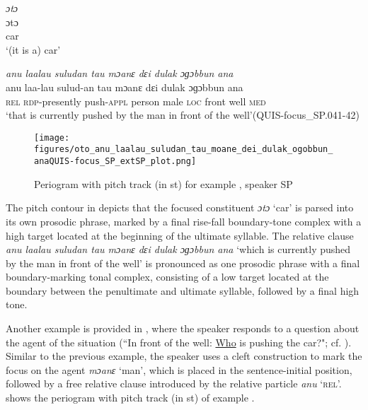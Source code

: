 \ea
\label{ex:Oto ana focus}
\ea
	\label{ex:oto1}
	\textit{ɔtɔ} \\
	\gll ɔtɔ\\
	car\\
	\glt `(it is a) car'

	\ex
	\label{ex:anu laalau suludan tau moane dɛi dulak ɔɡɔbbun ana1}
	\textit{anu la​a​lau suludan tau mɔanɛ dɛi dulak ɔɡɔbbun ana} \\
	\gll anu laa-lau sulud-an tau mɔanɛ dɛi dulak ɔɡɔbbun ana\\
	\textsc{rel} \textsc{rdp}-presently push-\textsc{appl} person male \textsc{loc} front well \textsc{med}\\
	\glt `that is currently pushed by the man in front of the well'\hfill (QUIS-focus\_SP.041-42)
\z
\z


\begin{figure}
	\texttt{[image: figures/oto\_anu\_laalau\_suludan\_tau\_moane\_dei\_dulak\_ogobbun\_anaQUIS-focus\_SP\_extSP\_plot.png]}
	\caption{Periogram with pitch track (in st) for example , speaker SP }
	\label{Oto ana focus}
\end{figure}



The pitch contour in  depicts that the focused constituent \textit{ɔtɔ} `car' is parsed into its own prosodic phrase, marked by a final rise-fall boundary-tone complex with a high target located at the beginning of the ultimate syllable. The relative clause \textit{anu la​a​lau suludan tau mɔanɛ dɛi dulak ɔɡɔbb​un ana} `which is currently pushed by the man in front of the well' is pronounced as one prosodic phrase with a final boundary-marking tonal complex, consisting of a low target located at the boundary between the penultimate and ultimate syllable, followed by a final high tone.





Another example is provided in , where the speaker responds to a question about the agent of the situation (``In front of the well: \underline{Who} is pushing the car?";   cf. \citealt[103]{Skopeteas.2006b}). Similar to the previous example, the speaker uses a cleft construction to mark the focus on the agent \textit{mɔanɛ} `man', which is placed in the sentence-initial position, followed by a free relative clause introduced by the relative particle \textit{anu} `\textsc{rel}'.  shows the periogram with pitch track (in st) of example 	.

